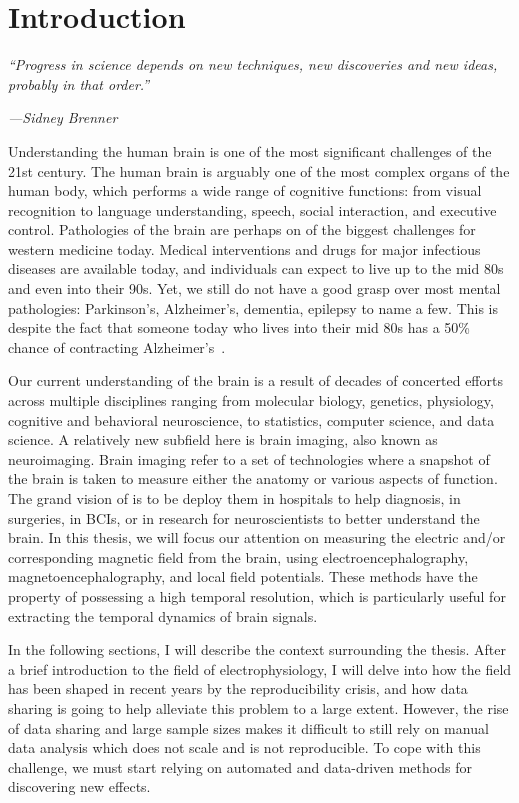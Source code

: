 \chapter{Introduction}
\label{chapter:intro}
\pagestyle{mainmatter}

\epigraph{\small\itshape ``Progress in science depends on new techniques, new discoveries and new ideas, probably in that order.''}{\small\textit{---Sidney Brenner}}

Understanding the human brain is one of the most significant challenges of the 21st century. The human brain is arguably one of the most complex  organs of the human body, which performs a wide range of cognitive functions: from visual recognition to language understanding, speech, social interaction, and executive control. Pathologies of the brain are perhaps on of the biggest challenges for western medicine today. Medical interventions and drugs for major infectious diseases are available today, and individuals can expect to live up to the mid 80s and even into their 90s. Yet, we still do not have a good grasp over most mental pathologies: Parkinson's, Alzheimer's, dementia, epilepsy to name a few. This is despite the fact that someone today who lives into their mid 80s has a 50\% chance of contracting Alzheimer's~\citep{alzheimer20162016}.

Our current understanding of the brain is a result of decades of concerted efforts across multiple disciplines ranging from molecular biology, genetics, physiology, cognitive and behavioral neuroscience, to statistics, computer science, and data science. A relatively new subfield here is brain imaging, also known as neuroimaging. Brain imaging refer to a set of technologies where a snapshot of the brain is taken to measure either the anatomy or various aspects of function. The grand vision of is to be deploy them in hospitals to help diagnosis, in surgeries, in \acp{BCI}, or in research for neuroscientists to better understand the brain. In this thesis, we will focus our attention on measuring the electric and/or corresponding magnetic field from the brain, using electroencephalography, magnetoencephalography, and local field potentials. These methods have the property of possessing a high temporal resolution, which is particularly useful for extracting the temporal dynamics of brain signals.

In the following sections, I will describe the context surrounding the thesis. After a brief introduction to the field of electrophysiology, I will delve into how the field has been shaped in recent years by the reproducibility crisis, and how data sharing is going to help alleviate this problem to a large extent. However, the rise of data sharing and large sample sizes makes it difficult to still rely on manual data analysis which does not scale and is not reproducible. To cope with this challenge, we must start relying on automated and data-driven methods for discovering new effects.
 
